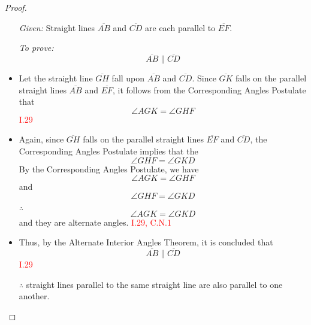 \begin{proof}

\begin{itemize}

\item[]

\textit{Given:} Straight lines $\overline{AB}$ and $\overline{CD}$ are each parallel to $\overline{EF}$.

\textit{To prove:} 
\[\overline{AB} \parallel  \overline{CD}\]

\item Let the straight line $\overline{GH}$ fall upon $\overline{AB}$ and $\overline{CD}$. Since $\overline{GK}$ falls on the parallel straight lines $\overline{AB}$ and $\overline{EF}$, it follows from the Corresponding Angles Postulate that 
\[\angle{AGK} = \angle{GHF}\]
\hfill\textcolor{red}{I.29}

\item Again, since $\overline{GH}$ falls on the parallel straight lines $\overline{EF}$ and $\overline{CD}$, the Corresponding Angles Postulate implies that the 
\[\angle{GHF} = \angle{GKD}\]
 By the Corresponding Angles Postulate, we have 
 \[\angle{AGK} = \angle{GHF}\]
 and
 \[ \angle{GHF} = \angle{GKD}\]
 
 \item[ $\therefore$] 
 \[\angle{AGK} = \angle{GKD}\] 
 and they are alternate angles. \hfill\textcolor{red}{I.29, C.N.1}

\item Thus, by the Alternate Interior Angles Theorem, it is concluded that 
\[\overline{AB} \parallel  \overline{CD}\] \hfill\textcolor{red}{I.29}

\item[$\therefore$] straight lines parallel to the same straight line are also parallel to one another.

\end{itemize}

\end{proof}

\clearpage
